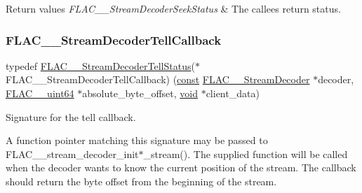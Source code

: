 \begin{DoxyRetVals}{Return values}
{\em F\+L\+A\+C\+\_\+\+\_\+\+Stream\+Decoder\+Seek\+Status} & The callee\textquotesingle{}s return status. \\
\hline
\end{DoxyRetVals}
\mbox{\label{group__flac__stream__decoder_gafdf1852486617a40c285c0d76d451a5a}} 
\subsubsection{\texorpdfstring{F\+L\+A\+C\+\_\+\+\_\+\+Stream\+Decoder\+Tell\+Callback}{FLAC\_\_StreamDecoderTellCallback}}
{\footnotesize\ttfamily typedef \hyperlink{group__flac__stream__decoder_ga83708207969383bd7b5c1e9148528845}{F\+L\+A\+C\+\_\+\+\_\+\+Stream\+Decoder\+Tell\+Status}($\ast$ F\+L\+A\+C\+\_\+\+\_\+\+Stream\+Decoder\+Tell\+Callback) (\hyperlink{zconf_8h_a2c212835823e3c54a8ab6d95c652660e}{const} \hyperlink{struct_f_l_a_c_____stream_decoder}{F\+L\+A\+C\+\_\+\+\_\+\+Stream\+Decoder} $\ast$decoder, \hyperlink{ordinals_8h_aa78c8c70a3eb8a58af7436f278acde8e}{F\+L\+A\+C\+\_\+\+\_\+uint64} $\ast$absolute\+\_\+byte\+\_\+offset, \hyperlink{png_8h_ac9c84fa68bbad002983e35ce3663c686}{void} $\ast$client\+\_\+data)}

Signature for the tell callback.

A function pointer matching this signature may be passed to F\+L\+A\+C\+\_\+\+\_\+stream\+\_\+decoder\+\_\+init$\ast$\+\_\+stream(). The supplied function will be called when the decoder wants to know the current position of the stream. The callback should return the byte offset from the beginning of the stream.

